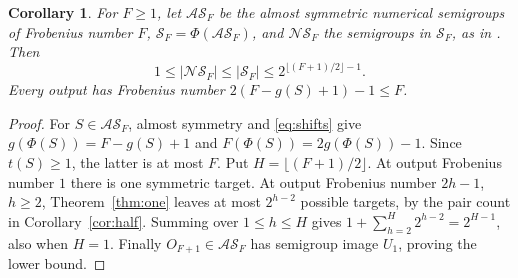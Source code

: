 \documentclass[11pt,a4paper]{article}
\newtheorem{corollary}[theorem]{Corollary}
\theoremstyle{definition}
\theoremstyle{remark}
\newcommand{\AS}{\mathcal{AS}}
\begin{document}
\begin{corollary}\label{cor:source-bound}
For $F\geq1$, let $\AS_F$ be the almost symmetric numerical semigroups
of Frobenius number $F$, $\mathcal S_F=\Phi(\AS_F)$, and
$\mathcal{NS}_F$ the semigroups in $\mathcal S_F$, as in
\cite[Section~5, pp.~8--9]{DSY}. Then
\[
 1\leq|\mathcal{NS}_F|\leq|\mathcal S_F|
 \leq 2^{\lfloor(F+1)/2\rfloor-1}.
\]
Every output has Frobenius number $2(F-g(S)+1)-1\leq F$.
\end{corollary}
\begin{proof}
For $S\in\AS_F$, almost symmetry and \eqref{eq:shifts} give
$g(\Phi(S))=F-g(S)+1$ and $F(\Phi(S))=2g(\Phi(S))-1$.
Since $t(S)\geq1$, the latter is at most $F$.
Put $H=\lfloor(F+1)/2\rfloor$. At output Frobenius number $1$ there is
one symmetric target. At output Frobenius number $2h-1$, $h\geq2$,
Theorem~\ref{thm:one} leaves at most $2^{h-2}$ possible targets,
by the pair count in Corollary~\ref{cor:half}.
Summing over $1\leq h\leq H$ gives
$1+\sum_{h=2}^{H}2^{h-2}=2^{H-1}$, also when $H=1$.
Finally $O_{F+1}\in\AS_F$ has semigroup image $U_1$, proving the lower bound.
\end{proof}
\end{document}
